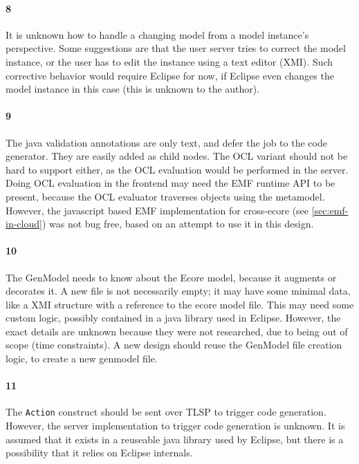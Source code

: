 \paragraph{8} It is unknown how to handle a changing model from a model instance's perspective.
Some suggestions are that the user server tries to correct the model instance, or the user has to edit the instance using a text editor (\acrshort{XMI}).
Such corrective behavior would require \gls{Eclipse} for now, if \gls{Eclipse} even changes the model instance in this case (this is unknown to the author).

\paragraph{9} The java validation annotations are only text, and defer the job to the code generator.
They are easily added as child nodes.
The \acrshort{OCL} variant should not be hard to support either, as the OCL evaluation would be performed in the server.
Doing OCL evaluation in the frontend may need the \acrshort{EMF} runtime \acrshort{API} to be present, because the OCL evaluator traverses objects using the metamodel.
However, the javascript based \acrshort{EMF} implementation for cross-ecore (see \cref{sec:emf-in-cloud}) was not bug free, based on an attempt to use it in this design.

\paragraph{10} The GenModel needs to know about the \gls{Ecore} model, because it augments or decorates it.
A new file is not necessarily empty; it may have some minimal data, like a \acrshort{XMI} structure with a reference to the ecore model file.
This may need some custom logic, possibly contained in a java library used in \gls{Eclipse}.
However, the exact details are unknown because they were not researched, due to being out of scope (time constraints).
A new design should reuse the GenModel file creation logic, to create a new genmodel file.

\paragraph{11} The \texttt{Action} construct should be sent over \acrshort{TLSP} to trigger code generation.
However, the server implementation to trigger code generation is unknown.
It is assumed that it exists in a reuseable java library used by \gls{Eclipse}, but there is a possibility that it relies on \gls{Eclipse} internals.

